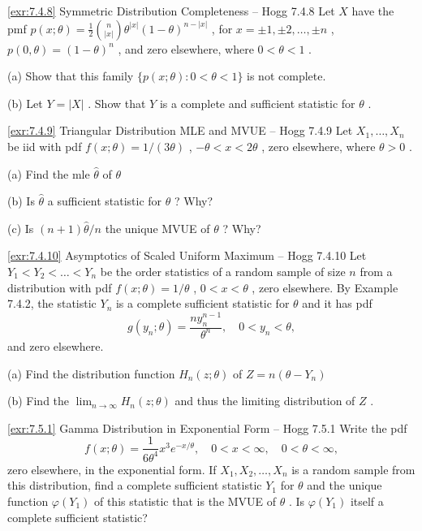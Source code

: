 \begin{exercise}{\ref{exr:7.4.8} Symmetric Distribution Completeness – Hogg 7.4.8}\label{exr:7.4.8}
Let $X$ have the pmf $p(x; \theta) = \frac{1}{2} \binom{n}{|x|} \theta^{|x|} (1 - \theta)^{n - |x|}$ , for $x = \pm 1, \pm 2, \ldots, \pm n$ , $p(0, \theta) = (1 - \theta)^n$ , and zero elsewhere, where $0 < \theta < 1$ .

(a) Show that this family $\{p(x;\theta):0 < \theta < 1\}$ is not complete.

(b) Let $Y = |X|$ . Show that $Y$ is a complete and sufficient statistic for $\theta$ .
\end{exercise}

\begin{exercise}{\ref{exr:7.4.9} Triangular Distribution MLE and MVUE – Hogg 7.4.9}\label{exr:7.4.9}
Let $X_{1},\ldots ,X_{n}$ be iid with pdf $f(x;\theta) = 1 / (3\theta)$ , $-\theta < x < 2\theta$ , zero elsewhere, where $\theta >0$ .

(a) Find the mle $\widehat{\theta}$ of $\theta$

(b) Is $\widehat{\theta}$ a sufficient statistic for $\theta$ ? Why?

(c) Is $(n + 1)\widehat{\theta} / n$ the unique MVUE of $\theta$ ? Why?
\end{exercise}

\begin{exercise}{\ref{exr:7.4.10} Asymptotics of Scaled Uniform Maximum – Hogg 7.4.10}\label{exr:7.4.10}
Let $Y_{1} < Y_{2} < \dots < Y_{n}$ be the order statistics of a random sample of size $n$ from a distribution with pdf $f(x; \theta) = 1 / \theta$ , $0 < x < \theta$ , zero elsewhere. By Example 7.4.2, the statistic $Y_{n}$ is a complete sufficient statistic for $\theta$ and it has pdf
\[
g(y_n; \theta) = \frac{n y_n^{n-1}}{\theta^n}, \quad 0 < y_n < \theta ,
\]
and zero elsewhere.

(a) Find the distribution function $H_{n}(z;\theta)$ of $Z = n(\theta - Y_{n})$

(b) Find the $\lim_{n\to \infty}H_n(z;\theta)$ and thus the limiting distribution of $Z$ .
\end{exercise}

\begin{exercise}{\ref{exr:7.5.1} Gamma Distribution in Exponential Form – Hogg 7.5.1}\label{exr:7.5.1}
Write the pdf
\[
f(x; \theta) = \frac{1}{6\theta^4} x^3 e^{-x/\theta}, \quad 0 < x < \infty, \quad 0 < \theta < \infty ,
\]
zero elsewhere, in the exponential form. If $X_{1}, X_{2}, \ldots, X_{n}$ is a random sample from this distribution, find a complete sufficient statistic $Y_{1}$ for $\theta$ and the unique function $\varphi(Y_{1})$ of this statistic that is the MVUE of $\theta$ . Is $\varphi(Y_{1})$ itself a complete sufficient statistic?
\end{exercise}

